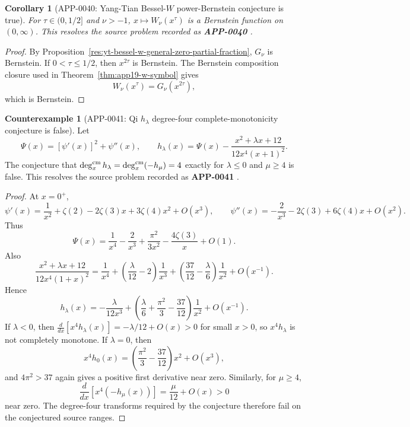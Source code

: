 \documentclass[11pt]{article}
\numberwithin{equation}{section}
\newtheorem{corollary}[theorem]{Corollary}
\theoremstyle{definition}
\newtheorem{counterexample}[theorem]{Counterexample}
\theoremstyle{remark}
\newcommand{\1}{\mathbf 1}
\begin{document}
\begin{corollary}[APP-0040: Yang-Tian Bessel-\(W\) power-Bernstein conjecture is true]
\label{res:yt-bessel-w-power-bernstein-conjecture}
For \(\tau\in(0,1/2]\) and \(\nu>-1\), \(x\mapsto W_\nu(x^\tau)\) is a Bernstein function on \((0,\infty)\).  This resolves the source problem recorded as \textbf{APP-0040} \cite{app-app-0040-source}.
\end{corollary}

\begin{proof}
By Proposition~\ref{res:yt-bessel-w-general-zero-partial-fraction}, \(G_\nu\) is Bernstein.  If \(0<\tau\le1/2\), then \(x^{2\tau}\) is Bernstein.  The Bernstein composition closure used in Theorem~\ref{thm:app19-w-symbol} gives
\[
W_\nu(x^\tau)=G_\nu(x^{2\tau}),
\]
which is Bernstein.
\end{proof}


\begin{counterexample}[APP-0041: Qi \(h_\lambda\) degree-four complete-monotonicity conjecture is false]
\label{res:not-qi-hlambda-degree4-conjecture}
Let
\[
\Psi(x)=[\psi'(x)]^2+\psi''(x),\qquad
h_\lambda(x)=\Psi(x)-\frac{x^2+\lambda x+12}{12x^4(x+1)^2}.
\]
The conjecture that \(\deg_x^{\rm cm}h_\lambda=\deg_x^{\rm cm}(-h_\mu)=4\) exactly for \(\lambda\le0\) and \(\mu\ge4\) is false.  This resolves the source problem recorded as \textbf{APP-0041} \cite{app-app-0041-source}.
\end{counterexample}

\begin{proof}
At \(x=0^+\),
\[
\psi'(x)=\frac1{x^2}+\zeta(2)-2\zeta(3)x+3\zeta(4)x^2+O(x^3),
\qquad
\psi''(x)=-\frac2{x^3}-2\zeta(3)+6\zeta(4)x+O(x^2).
\]
Thus
\[
\Psi(x)=\frac1{x^4}-\frac2{x^3}+\frac{\pi^2}{3x^2}-\frac{4\zeta(3)}x+O(1).
\]
Also
\[
\frac{x^2+\lambda x+12}{12x^4(1+x)^2}
=\frac1{x^4}+\left(\frac{\lambda}{12}-2\right)\frac1{x^3}
+\left(\frac{37}{12}-\frac{\lambda}{6}\right)\frac1{x^2}+O(x^{-1}).
\]
Hence
\[
h_\lambda(x)
=-\frac{\lambda}{12x^3}
+\left(\frac{\lambda}{6}+\frac{\pi^2}{3}-\frac{37}{12}\right)\frac1{x^2}
+O(x^{-1}).
\]
If \(\lambda<0\), then \(\frac{d}{dx}[x^4h_\lambda(x)]=-\lambda/12+O(x)>0\) for small \(x>0\), so \(x^4h_\lambda\) is not completely monotone.  If \(\lambda=0\), then
\[
x^4h_0(x)=\left(\frac{\pi^2}{3}-\frac{37}{12}\right)x^2+O(x^3),
\]
and \(4\pi^2>37\) again gives a positive first derivative near zero.  Similarly, for \(\mu\ge4\),
\[
\frac{d}{dx}[x^4(-h_\mu(x))]=\frac{\mu}{12}+O(x)>0
\]
near zero.  The degree-four transforms required by the conjecture therefore fail on the conjectured source ranges.
\end{proof}
\end{document}
